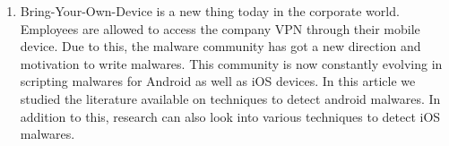 \documentclass[11pt]{article}
\begin{document}
\begin{enumerate}
		\item Bring-Your-Own-Device is a new thing today in the corporate world. Employees are allowed to access the company VPN through their mobile device. Due to this, the malware community has got a new direction and motivation to write malwares. This community is now constantly evolving in scripting malwares for Android as well as iOS devices. In this article we studied the literature available on techniques to detect android malwares. In addition to this, research can also look into various techniques to detect iOS malwares. 
	\end{enumerate}



\end{document}
